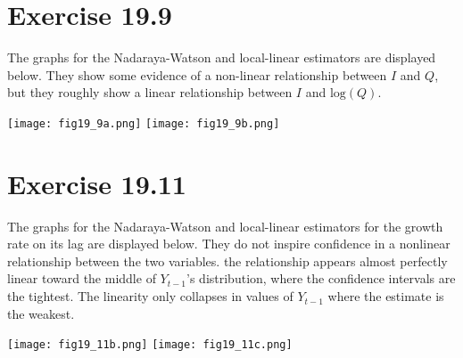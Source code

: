 \documentclass{article}
\newcommand{\loge}[1]{\text{log}\left(#1\right)}
\begin{document}
\section*{Exercise 19.9}
The graphs for the Nadaraya-Watson and local-linear estimators are displayed below. They show some evidence of a non-linear relationship between $I$ and $Q$, but they roughly show a linear relationship between $I$ and $\loge{Q}$.
\begin{center}
	\texttt{[image: fig19\_9a.png]}
	\texttt{[image: fig19\_9b.png]}
\end{center}


\section*{Exercise 19.11}
The graphs for the Nadaraya-Watson and local-linear estimators for the growth rate on its lag are displayed below. They do not inspire confidence in a nonlinear relationship between the two variables. the relationship appears almost perfectly linear toward the middle of $Y_{t-1}$'s distribution, where the confidence intervals are the tightest. The linearity only collapses in values of $Y_{t-1}$ where the estimate is the weakest.
\begin{center}
	\texttt{[image: fig19\_11b.png]}
	\texttt{[image: fig19\_11c.png]}
\end{center}


\end{document}
